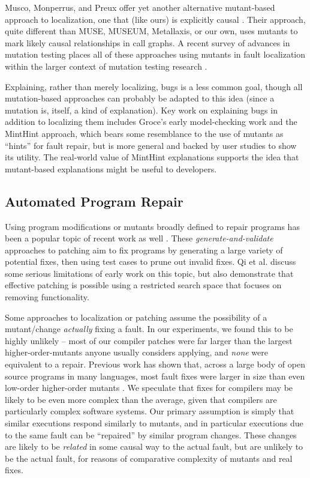 Musco, Monperrus, and Preux offer yet another alternative mutant-based approach to localization, one that (like ours) is explicitly causal \cite{Musco}.  Their approach, quite different than MUSE, MUSEUM, Metallaxis, or our own, uses mutants to mark likely causal relationships in call graphs.  A recent survey of advances in mutation testing places all of these approaches using mutants in fault localization within the larger context of mutation testing research \cite{MutationSurvey}.

Explaining, rather than merely localizing, bugs is a less common goal, though all mutation-based approaches can probably be adapted to this idea (since a mutation is, itself, a kind of explanation).  Key work on explaining bugs in addition to localizing them includes Groce's early model-checking work \cite{GroceError,ChakiLev} and the MintHint \cite{MintHint} approach, which bears some resemblance to the use of mutants as ``hints'' for fault repair, but is more general and backed by user studies to show its utility.  The real-world value of MintHint explanations supports the idea that mutant-based explanations might be useful to developers.

\subsection{Automated Program Repair}

Using program modifications or mutants broadly defined to repair programs has been a popular topic of recent work as well \cite{GenProg,AutoRep,WeiFix}.  These \emph{generate-and-validate} approaches to patching aim to fix programs by generating a large variety of potential fixes, then using test cases to prune out invalid fixes.  Qi et al. \cite{achour} discuss some serious limitations of early work on this topic, but also demonstrate that effective patching is possible using a restricted search space that focuses on removing functionality.

Some approaches to localization or patching assume the possibility of a mutant/change \emph{actually} fixing a fault.  In our experiments, we found this to be highly unlikely -- most of our compiler patches were far larger than the largest higher-order-mutants \cite{jia2009higher} anyone usually considers applying, and \emph{none} were equivalent to a repair.  Previous work has shown that, across a large body of open source programs in many languages, most fault fixes were larger in size than even low-order higher-order mutants \cite{GopinathMutants}.
We speculate that fixes for compilers may be likely to be even more complex than the average, given that compilers are particularly complex software systems.  
Our primary assumption is simply that similar executions respond similarly to mutants, and in particular executions due to the same fault can be ``repaired'' by similar program changes.  These changes are likely to be \emph{related} in some causal way to the actual fault, but are unlikely to be the actual fault, for reasons of comparative complexity of mutants and real fixes.

